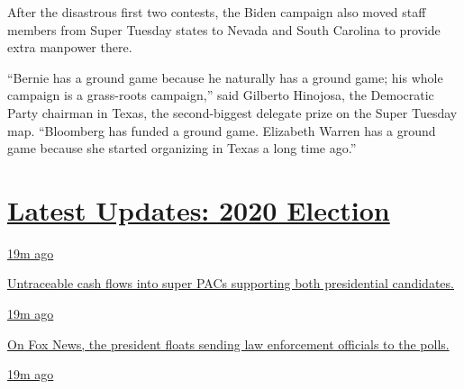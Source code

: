 After the disastrous first two contests, the Biden campaign also moved
staff members from Super Tuesday states to Nevada and South Carolina to
provide extra manpower there.

``Bernie has a ground game because he naturally has a ground game; his
whole campaign is a grass-roots campaign,'' said Gilberto Hinojosa, the
Democratic Party chairman in Texas, the second-biggest delegate prize on
the Super Tuesday map. ``Bloomberg has funded a ground game. Elizabeth
Warren has a ground game because she started organizing in Texas a long
time ago.''

\hypertarget{latest-updates-2020-election}{%
\section{\texorpdfstring{\href{https://www.nytimes3xbfgragh.onion/live/2020/08/21/us/dnc-convention-election?action=click\&pgtype=Article\&state=default\&region=MAIN_CONTENT_1\&context=storylines_live_updates}{Latest
Updates: 2020
Election}}{Latest Updates: 2020 Election}}\label{latest-updates-2020-election}}

\href{https://www.nytimes3xbfgragh.onion/live/2020/08/21/us/dnc-convention-election?action=click\&pgtype=Article\&state=default\&region=MAIN_CONTENT_1\&context=storylines_live_updates\#untraceable-cash-flows-into-super-pacs-supporting-both-presidential-candidates}{19m
ago}

\href{https://www.nytimes3xbfgragh.onion/live/2020/08/21/us/dnc-convention-election?action=click\&pgtype=Article\&state=default\&region=MAIN_CONTENT_1\&context=storylines_live_updates\#untraceable-cash-flows-into-super-pacs-supporting-both-presidential-candidates}{Untraceable
cash flows into super PACs supporting both presidential candidates.}

\href{https://www.nytimes3xbfgragh.onion/live/2020/08/21/us/dnc-convention-election?action=click\&pgtype=Article\&state=default\&region=MAIN_CONTENT_1\&context=storylines_live_updates\#on-fox-news-the-president-floats-sending-law-enforcement-officials-to-the-polls}{19m
ago}

\href{https://www.nytimes3xbfgragh.onion/live/2020/08/21/us/dnc-convention-election?action=click\&pgtype=Article\&state=default\&region=MAIN_CONTENT_1\&context=storylines_live_updates\#on-fox-news-the-president-floats-sending-law-enforcement-officials-to-the-polls}{On
Fox News, the president floats sending law enforcement officials to the
polls.}

\href{https://www.nytimes3xbfgragh.onion/live/2020/08/21/us/dnc-convention-election?action=click\&pgtype=Article\&state=default\&region=MAIN_CONTENT_1\&context=storylines_live_updates\#how-biden-and-trump-indirectly-laid-out-the-choice-america-faces}{19m
ago}

